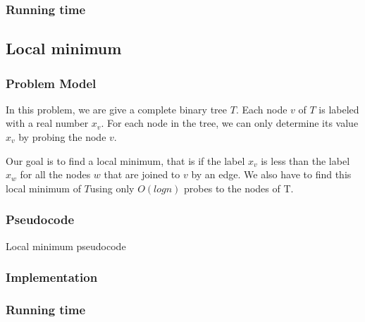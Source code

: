 \documentclass{article}
\begin{document}
\subsubsection*{Running time}


\subsection*{Local minimum}

\subsubsection*{Problem Model}

In this problem, we are give a complete binary tree $T$. Each node $v$ of $T$ is labeled with a real number $x_v$. For each node in the tree, we can only determine its value $x_v$ by probing the node $v$.

Our goal is to find a local minimum, that is if the label $x_v$ is less than the label $x_w$ for all the nodes $w$ that are joined to $v$ by an edge.  We also have to find this local minimum of $T$using only $O(log n)$ probes to the nodes of T.

\subsubsection*{Pseudocode}

\begin{algorithm}[H]
\caption{Local minimum pseudocode}
\begin{algorithmic}[1]
\end{algorithmic}
\end{algorithm}

\subsubsection*{Implementation}

\subsubsection*{Running time}
\end{document}

